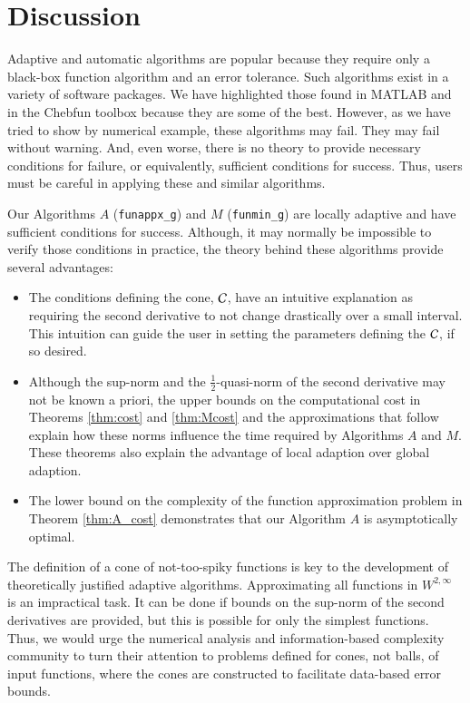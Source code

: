 \documentclass[review]{elsarticle}
\theoremstyle{definition}
\newcommand{\funappxg}{\texttt{funappx\_g}\xspace}
\newcommand{\funming}{\texttt{funmin\_g}\xspace}
\begin{document}
\section{Discussion}

Adaptive and automatic algorithms are popular because they require only a black-box function algorithm and an error tolerance.
Such algorithms exist in a variety of software packages.  We have highlighted those found in MATLAB and in the Chebfun
toolbox because they are some of the best.  However, as we have tried to show by numerical example, these algorithms may fail.  They may fail without warning.  And, even worse, there is no theory to provide necessary conditions for failure, or equivalently, sufficient conditions for success.  Thus, users must be careful
in applying these and similar algorithms.

Our Algorithms $A$ (\funappxg) and $M$ (\funming) are locally adaptive and have sufficient conditions for success.  Although, it may normally be impossible to verify those conditions in practice, the theory behind these algorithms provide several advantages:

\begin{itemize}
	\item The conditions defining the cone, $\mathcal{C}$, have an intuitive explanation as requiring the second derivative to not change  drastically over a small interval.  This intuition can guide the user in setting the parameters defining the $\mathcal{C}$, if so desired.
	
	\item Although the sup-norm and the $\frac 12$-quasi-norm of the second derivative may not be known a priori, the upper bounds on the computational cost in Theorems \ref{thm:cost} and \ref{thm:Mcost} and the approximations that follow explain how these norms influence the time required by Algorithms $A$ and $M$.  These theorems also explain the advantage of local adaption over global adaption.
	
	\item The lower bound on the complexity of the function approximation problem in Theorem \ref{thm:A_cost}  demonstrates that our Algorithm $A$ is asymptotically optimal.
\end{itemize}

The definition of a cone of not-too-spiky functions is key to the development of theoretically justified adaptive algorithms.  Approximating all functions in $W^{2,\infty}$ is an impractical task.  It can be done if bounds on the sup-norm of the second derivatives are provided, but this is possible for only the simplest functions.  Thus, we would urge the numerical analysis and information-based complexity community to turn their attention to problems defined for cones, not balls, of input functions, where the cones are constructed to facilitate data-based error bounds.
\end{document}
